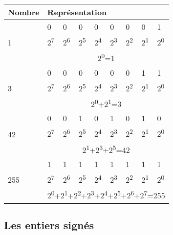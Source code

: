 \begin{table}
\centering
\begin{tabular}{|l|l|l|l|l|l|l|l|l|}\hline
  \rowcolor{gris-tab-entete}\bf Nombre&\multicolumn{8}{l|}{\bf Représentation}\\
  \hline
  \multirow{3}{2cm}{1} & 0 & 0 & 0 & 0 & 0 & 0 & 0 & 1 \\ 
  \cline{2-9}
  &2\textsuperscript{7}&2\textsuperscript{6}&2\textsuperscript{5}&2\textsuperscript{4}&2\textsuperscript{3}&2\textsuperscript{2}&2\textsuperscript{1}&2\textsuperscript{0}\\ 
  \cline{2-9}
   &\multicolumn{8}{c|}{2\textsuperscript{0}=1}\\ 
  \hline
  \multirow{3}{2cm}{3} & 0 & 0 & 0 & 0 & 0 & 0 & 1 & 1 \\
  \cline{2-9}
  &2\textsuperscript{7}&2\textsuperscript{6}&2\textsuperscript{5}&2\textsuperscript{4}&2\textsuperscript{3}&2\textsuperscript{2}&2\textsuperscript{1}&2\textsuperscript{0}\\
  \cline{2-9}
  &\multicolumn{8}{c|}{2\textsuperscript{0}+2\textsuperscript{1}=3}\\
  \hline
  \multirow{3}{2cm}{42} & 0 & 0 & 1 & 0 & 1 & 0 & 1 & 0 \\
  \cline{2-9}
  &2\textsuperscript{7}&2\textsuperscript{6}&2\textsuperscript{5}&2\textsuperscript{4}&2\textsuperscript{3}&2\textsuperscript{2}&2\textsuperscript{1}&2\textsuperscript{0}\\
  \cline{2-9}
  &\multicolumn{8}{c|}{2\textsuperscript{1}+2\textsuperscript{3}+2\textsuperscript{5}=42}\\
  \hline
  \multirow{3}{2cm}{255} & 1 & 1 & 1 & 1 & 1 & 1 & 1 & 1 \\
  \cline{2-9}
  &2\textsuperscript{7}&2\textsuperscript{6}&2\textsuperscript{5}&2\textsuperscript{4}&2\textsuperscript{3}&2\textsuperscript{2}&2\textsuperscript{1}&2\textsuperscript{0}\\
  \cline{2-9}
  &\multicolumn{8}{c|}{2\textsuperscript{0}+2\textsuperscript{1}+2\textsuperscript{2}+2\textsuperscript{3}+2\textsuperscript{4}+2\textsuperscript{5}+2\textsuperscript{6}+2\textsuperscript{7}=255}\\
  \hline
\end{tabular}
\end{table}

\subsection{Les entiers signés}
\label{les-entiers-signes-1}

